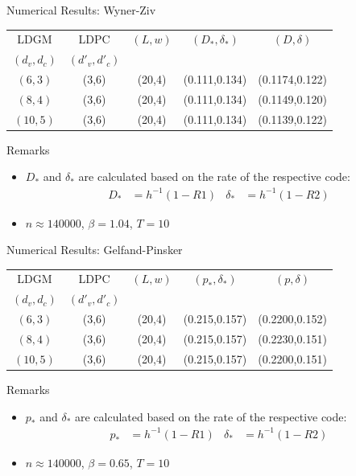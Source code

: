 \documentclass[10pt]{beamer}
\begin{document}
\begin{frame}{Numerical Results: Wyner-Ziv}
  \begin{center}
    \begin{tabular}{|c|c|c|c|c|}
      \hline
      LDGM & LDPC & $(L,w)$ & $(D_{*},\delta_{*})$ & $(D,\delta)$ \\
      $(d_v,d_c)$ & $(d'_v,d'_c)$ &  &  & \\
      \hline
      $(6,3)$ & (3,6) & (20,4)  & (0.111,0.134)  & (0.1174,0.122) \\
      $(8,4)$ & (3,6) & (20,4)  & (0.111,0.134)  & (0.1149,0.120) \\
      $(10,5)$ & (3,6) & (20,4)  & (0.111,0.134)  & (0.1139,0.122) \\
      \hline  
    \end{tabular}
  \end{center}
  \begin{block}{Remarks}
    \begin{itemize}
    \item $D_*$ and $\delta_*$ are calculated based on the rate of the respective code:
      \begin{align*}
        D_*&=h^{-1}(1-R1)  & \delta_*&=h^{-1}(1-R2)
      \end{align*}
    \item $n\approx 140000$, $\beta=1.04$, $T=10$
    \end{itemize}
  \end{block}
\end{frame}

\begin{frame}{Numerical Results: Gelfand-Pinsker}
  \begin{center}
    \begin{tabular}{|c|c|c|c|c|}
      \hline
      LDGM & LDPC & $(L,w)$ & $(p_{*},\delta_{*})$ & $(p,\delta)$ \\
      $(d_v,d_c)$ & $(d'_v,d'_c)$ &  &  & \\
      \hline
      $(6,3)$ & (3,6) & (20,4)  & (0.215,0.157)  & (0.2200,0.152) \\
      $(8,4)$ & (3,6) & (20,4)  & (0.215,0.157)  & (0.2230,0.151) \\
      $(10,5)$ & (3,6) & (20,4)  & (0.215,0.157)  & (0.2200,0.151) \\
      \hline
    \end{tabular}
  \end{center}
  \begin{block}{Remarks}
    \begin{itemize}
    \item $p_*$ and $\delta_*$ are calculated based on the rate of the respective code:
      \begin{align*}
        p_*&=h^{-1}(1-R1)  & \delta_*&=h^{-1}(1-R2)
      \end{align*}
    \item $n\approx 140000$, $\beta=0.65$, $T=10$
    \end{itemize}
  \end{block}
\end{frame}
\end{document}
